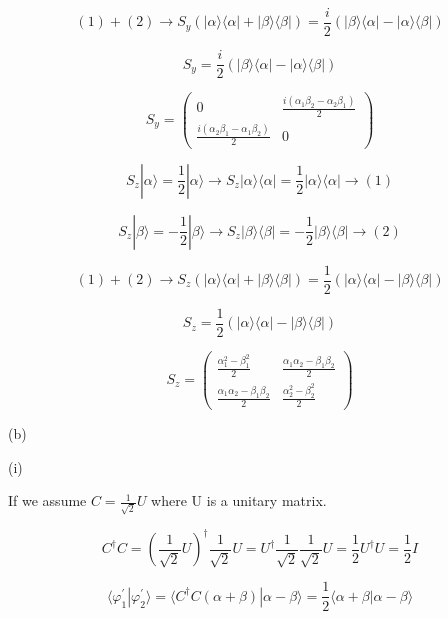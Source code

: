 \documentclass[12pt]{article}
\begin{document}
\[
    (1) + (2) \longrightarrow S_y (| \alpha \rangle \langle \alpha | + | \beta \rangle \langle \beta |)
    = \frac{i}{2} (| \beta \rangle \langle \alpha | - | \alpha \rangle \langle \beta |)
\]

\[
    S_y = \frac{i}{2} (| \beta \rangle \langle \alpha | - | \alpha \rangle \langle \beta |)
\]

\[
    S_y =
    \begin{pmatrix}
        0                                              & \frac{i(\alpha_1\beta_2 - \alpha_2\beta_1)}{2} \\
        \frac{i(\alpha_2\beta_1 - \alpha_1\beta_2)}{2} & 0
    \end{pmatrix}
\]

\[
    S_z | \alpha \rangle = \frac{1}{2} | \alpha \rangle
    \rightarrow  S_z | \alpha \rangle \langle \alpha |
    = \frac{1}{2} | \alpha \rangle \langle \alpha | \longrightarrow (1)
\]

\[
    S_z | \beta \rangle = - \frac{1}{2} | \beta \rangle
    \rightarrow  S_z | \beta \rangle \langle \beta |
    = - \frac{1}{2} | \beta \rangle \langle \beta | \longrightarrow (2)
\]

\[
    (1) + (2) \longrightarrow S_z (| \alpha \rangle \langle \alpha | + | \beta \rangle \langle \beta |)
    = \frac{1}{2} (| \alpha \rangle \langle \alpha | - | \beta \rangle \langle \beta |)
\]

\[
    S_z = \frac{1}{2} (| \alpha \rangle \langle \alpha | - | \beta \rangle \langle \beta |)
\]

\[
    S_z =
    \begin{pmatrix}
        \frac{\alpha_1^2 - \beta_1^2}{2}          & \frac{\alpha_1\alpha_2-\beta_1\beta_2}{2} \\
        \frac{\alpha_1\alpha_2-\beta_1\beta_2}{2} & \frac{\alpha_2^2 - \beta_2^2}{2}
    \end{pmatrix}
\]

(b)

(i)

If we assume \(C = \frac{1}{\sqrt{2}}U\) where U is a unitary matrix.

\[
    C^\dagger C = {\left(\frac{1}{\sqrt{2}}U\right) }^\dagger\frac{1}{\sqrt{2}}U
    = U^\dagger \frac{1}{\sqrt{2}} \frac{1}{\sqrt{2}} U
    = \frac{1}{2} U^\dagger U
    = \frac{1}{2} I
\]

\[
    \langle \varphi_1^{\prime} | \varphi_2^{\prime} \rangle
    = \langle C^\dagger C(\alpha + \beta) | \alpha - \beta \rangle
    = \frac{1}{2} \langle \alpha + \beta | \alpha - \beta \rangle
\]
\end{document}
